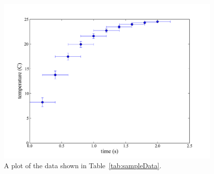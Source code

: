 \begin{prob}
\begin{figure}[htb]
  \includegraphics[width=.85\linewidth]{Figures/SimplePlots/dataPlot.pdf}%
  \caption{A plot of the data shown in Table~\ref{tab:sampleData}.}
  \label{fig:sampleDataPlot}%
\end{figure}


\end{prob}


